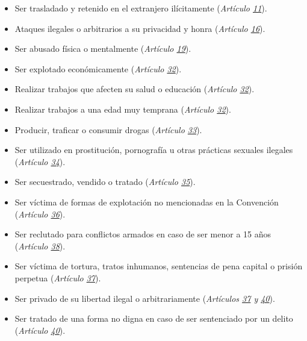 \documentclass{tufte-handout}
\begin{document}
\begin{itemize}
\item{Ser trasladado y retenido en el extranjero ilícitamente (\textit{Artículo \href{https://procosi.github.io/nenes/convencion/?a=11}{11}}).}
\item{Ataques ilegales o arbitrarios a su privacidad y honra (\textit{Artículo \href{https://procosi.github.io/nenes/convencion/?a=16}{16}}).}
\item{Ser abusado física o mentalmente (\textit{Artículo \href{https://procosi.github.io/nenes/convencion/?a=19}{19}}).}
\item{Ser explotado económicamente (\textit{Artículo \href{https://procosi.github.io/nenes/convencion/?a=32}{32}}).}
\item{Realizar trabajos que afecten su salud o educación (\textit{Artículo \href{https://procosi.github.io/nenes/convencion/?a=32}{32}}).}
\item{Realizar trabajos a una edad muy temprana (\textit{Artículo \href{https://procosi.github.io/nenes/convencion/?a=32}{32}}).}
\item{Producir, traficar o consumir drogas (\textit{Artículo \href{https://procosi.github.io/nenes/convencion/?a=33}{33}}).}
\item{Ser utilizado en prostitución, pornografía u otras prácticas sexuales ilegales (\textit{Artículo \href{https://procosi.github.io/nenes/convencion/?a=34}{34}}).}
\item{Ser secuestrado, vendido o tratado (\textit{Artículo \href{https://procosi.github.io/nenes/convencion/?a=35}{35}}).}
\item{Ser víctima de formas de explotación no mencionadas en la Convención (\textit{Artículo \href{https://procosi.github.io/nenes/convencion/?a=36}{36}}).}
\item{Ser reclutado para conflictos armados en caso de ser menor a 15 años (\textit{Artículo \href{https://procosi.github.io/nenes/convencion/?a=38}{38}}).}
\item{Ser víctima de tortura, tratos inhumanos, sentencias de pena capital o prisión perpetua (\textit{Artículo \href{https://procosi.github.io/nenes/convencion/?a=37}{37}}).}
\item{Ser privado de su libertad ilegal o arbitrariamente (\textit{Artículos \href{https://procosi.github.io/nenes/convencion/?a=37}{37} y \href{https://procosi.github.io/nenes/convencion/?a=40}{40}}).}
\item{Ser tratado de una forma no digna en caso de ser sentenciado por un delito (\textit{Artículo \href{https://procosi.github.io/nenes/convencion/?a=40}{40}}).}
\end{itemize}
\end{document}
